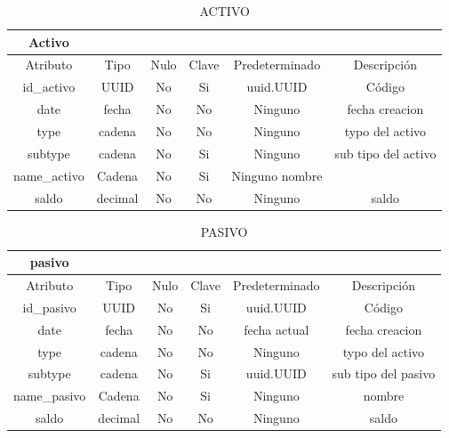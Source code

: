 \documentclass{article}
\begin{document}
\begin{table}[H]
    \centering
    \begin{tabular}{|c|c|c|c|c|c|}
    \hline
Activo	& & & & & \\					
\hline

Atributo	&Tipo&	Nulo&	Clave	&Predeterminado	&Descripción\\
\hline

id_activo&	UUID&	No&	Si	&uuid.UUID	&Código\\
\hline

date&	fecha	&No&	No	&Ninguno	&fecha creacion\\
\hline

type	&cadena	&No	&No&	Ninguno&	typo del activo\\
\hline

subtype	&cadena&	No&	Si&	Ninguno&	sub tipo del activo\\
\hline
name_activo&	Cadena&	No&	Si&Ninguno	nombre\\
\hline

saldo&	decimal&	No	&No	&Ninguno&	saldo\\
\hline
    \end{tabular}
    \caption{ACTIVO}
    \label{}
\end{table}

\begin{table}[H]
    \centering
    \begin{tabular}{|c|c|c|c|c|c|}
    \hline
pasivo	& & & & & \\	
\hline

Atributo&	Tipo&	Nulo&	Clave&	Predeterminado	&Descripción\\
\hline

id_pasivo&	UUID&	No&	Si&	uuid.UUID&	Código\\
\hline

date&	fecha&	No	&No	&fecha actual&	fecha creacion\\
\hline

type&	cadena	&No	&No&	Ninguno	&typo del activo\\
\hline

subtype&	cadena&	No&	Si&	uuid.UUID&	sub tipo del pasivo\\
\hline

name_pasivo&	Cadena&	No	&Si	&Ninguno	&nombre\\
\hline

saldo&	decimal&	No	&No	&Ninguno	&saldo\\
\hline
    \end{tabular}
    \caption{PASIVO}
    \label{}
\end{table}
\end{document}

